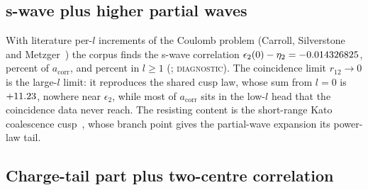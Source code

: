 \documentclass[aps,prd,onecolumn,amsmath,amssymb,longbibliography,floatfix,nofootinbib]{revtex4-2}
\newcommand{\acorr}{a_{\mathrm{corr}}}
\newcommand{\st}[1]{\textsc{#1}}
\begin{document}
\subsection{s-wave plus higher partial waves}
With literature per-$l$ increments of the Coulomb problem (Carroll, Silverstone and Metzger~\cite{CSM1979}) the corpus finds the s-wave correlation $\epsilon_2(0)-\eta_2=-0.014326825$, \SwaveFracVal{} percent of $\acorr$, and \HigherlFracVal{} percent in $l\ge1$ (; \st{diagnostic}). The coincidence limit $r_{12}\to0$ is the large-$l$ limit: it reproduces the shared cusp law, whose sum from $l=0$ is $+11.23$, nowhere near $\epsilon_2$, while most of $\acorr$ sits in the low-$l$ head that the coincidence data never reach. The resisting content is the short-range Kato coalescence cusp~\cite{Kato1957}, whose branch point gives the partial-wave expansion its power-law tail.

\subsection{Charge-tail part plus two-centre correlation}
\end{document}
